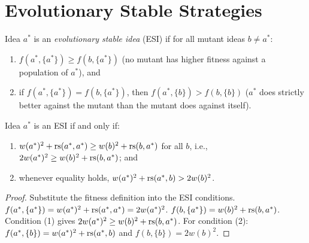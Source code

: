 \section{Evolutionary Stable Strategies}

\begin{definition}
\label{def:esi}
Idea $a^*$ is an \emph{evolutionary stable idea} (ESI) if for all
mutant ideas $b \neq a^*$:
\begin{enumerate}
  \item $f(a^*, \{a^*\}) \geq f(b, \{a^*\})$ (no mutant has higher fitness
        against a population of $a^*$), and
  \item if $f(a^*, \{a^*\}) = f(b, \{a^*\})$, then
        $f(a^*, \{b\}) > f(b, \{b\})$ ($a^*$ does strictly better against
        the mutant than the mutant does against itself).
\end{enumerate}
\end{definition}

\begin{theorem}
\label{thm:esi-characterization}
Idea $a^*$ is an ESI if and only if:
\begin{enumerate}
  \item $w(a^*)^2 + \mathrm{rs}(a^*, a^*) \geq w(b)^2 + \mathrm{rs}(b, a^*)$ for all $b$,
        i.e., $2w(a^*)^2 \geq w(b)^2 + \mathrm{rs}(b, a^*)$; and
  \item whenever equality holds, $w(a^*)^2 + \mathrm{rs}(a^*, b) > 2w(b)^2$.
\end{enumerate}
\end{theorem}

\begin{proof}
Substitute the fitness definition into the ESI conditions.
$f(a^*, \{a^*\}) = w(a^*)^2 + \mathrm{rs}(a^*, a^*) = 2w(a^*)^2$.
$f(b, \{a^*\}) = w(b)^2 + \mathrm{rs}(b, a^*)$.
Condition (1) gives $2w(a^*)^2 \geq w(b)^2 + \mathrm{rs}(b, a^*)$.
For condition (2): $f(a^*, \{b\}) = w(a^*)^2 + \mathrm{rs}(a^*, b)$ and
$f(b, \{b\}) = 2w(b)^2$.
\end{proof}


